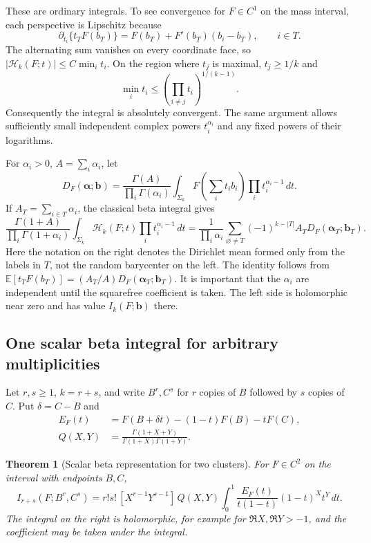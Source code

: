 \documentclass[11pt,a4paper]{article}
\numberwithin{equation}{section}
\newtheorem{theorem}{Theorem}[section]
\theoremstyle{definition}
\theoremstyle{remark}
\begin{document}
These are ordinary integrals.  To see convergence for $F\in C^1$
on the mass interval, each perspective is Lipschitz because
\[
 \partial_{t_i}\{t_TF(b_T)\}
    =F(b_T)+F'(b_T)(b_i-b_T),\qquad i\in T.
\]
The alternating sum vanishes on every coordinate face, so
$|\mathcal H_k(F;t)|\le C\min_i t_i$.
On the region where $t_j$ is maximal, $t_j\ge1/k$ and
\[
 \min_i t_i\le\left(\prod_{i\ne j}t_i\right)^{1/(k-1)}.
\]
Consequently the integral is absolutely convergent.  The same argument
allows sufficiently small independent complex powers $t_i^{\alpha_i}$
and any fixed powers of their logarithms.

For $\alpha_i>0$, $A=\sum_i\alpha_i$, let
\[
 D_F(\boldsymbol\alpha;\boldsymbol b)
   =\frac{\Gamma(A)}{\prod_i\Gamma(\alpha_i)}
      \int_{\Sigma_k}F\!\left(\sum_i t_i b_i\right)
                            \prod_i t_i^{\alpha_i-1}\,dt.
\]
If $A_T=\sum_{i\in T}\alpha_i$, the classical beta integral
\cite{dlmfbeta} gives
\begin{equation}\label{tc:eq:independent-regulators}
 \frac{\Gamma(1+A)}{\prod_i\Gamma(1+\alpha_i)}
 \int_{\Sigma_k}\mathcal H_k(F;t)
                     \prod_i t_i^{\alpha_i-1}\,dt
 =\frac{1}{\prod_i\alpha_i}
   \sum_{\varnothing\ne T}(-1)^{k-|T|}
                  A_TD_F(\boldsymbol\alpha_T;\boldsymbol b_T).
\end{equation}
Here the notation on the right denotes the Dirichlet mean formed
only from the labels in $T$, not the random barycenter on the left.
The identity follows from
$\mathbb E[t_TF(b_T)]=(A_T/A)D_F(\boldsymbol\alpha_T;\boldsymbol b_T)$.
It is important that the $\alpha_i$ are independent until the
squarefree coefficient is taken.  The left side is holomorphic near
zero and has value $I_k(F;\boldsymbol b)$ there.

\subsection{One scalar beta integral for arbitrary multiplicities}

Let $r,s\ge1$, $k=r+s$, and write $B^r,C^s$ for $r$ copies of
$B$ followed by $s$ copies of $C$.  Put $\delta=C-B$ and
\begin{align}
 E_F(t)&=F(B+\delta t)-(1-t)F(B)-tF(C),\label{tc:eq:chord}\\
 Q(X,Y)&=\frac{\Gamma(1+X+Y)}{\Gamma(1+X)\Gamma(1+Y)}.
                                                     \label{tc:eq:Q}
\end{align}

\begin{theorem}[Scalar beta representation for two clusters]
\label{tc:thm:beta}
For $F\in C^2$ on the interval with endpoints $B,C$,
\begin{equation}\label{tc:eq:beta-representation}
 \boxed{\displaystyle
 I_{r+s}(F;B^r,C^s)
   =r!s!\,[X^{r-1}Y^{s-1}]\,
      Q(X,Y)\int_0^1
      \frac{E_F(t)}{t(1-t)}(1-t)^X t^Y\,dt.}
\end{equation}
The integral on the right is holomorphic, for example for
$\Re X,\Re Y>-1$, and the coefficient may be taken under the integral.
\end{theorem}
\end{document}
